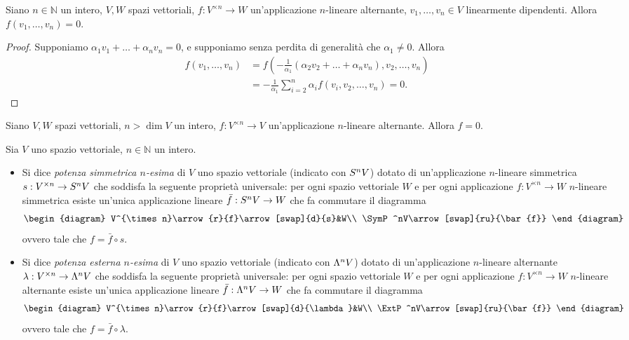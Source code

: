 \begin{proposition}
Siano $n\in\mathbb{N}$ un intero, $V\comma W$ spazi vettoriali, $f:V^{\times n}\to W$ un'applicazione $n$-lineare alternante, $v_1,\ldots,v_n\in V$ linearmente dipendenti. Allora $f(v_1,\ldots,v_n)=0$.
\end{proposition}
\begin{proof}
Supponiamo $\alpha_1v_1+\ldots+\alpha_nv_n=0$, e supponiamo senza perdita di generalità che $\alpha_1\neq 0$. Allora
\begin{align*}
f(v_1,\ldots,v_n)&=f\left(-\frac{1}{\alpha_1}(\alpha_2v_2+\ldots+\alpha_nv_n),v_2,\ldots,v_n\right)\\
&=-\frac{1}{\alpha_1}\sum_{i=2}^{n}\alpha_if(v_i,v_2,\ldots,v_n)=0.
\end{align*}
\end{proof}

\begin{corollary}
Siano $V\comma W$ spazi vettoriali, $n>\dim V$ un intero, $f:V^{\times n}\to V$ un'applicazione $n$-lineare alternante. Allora $f=0$.
\end{corollary}

\begin{definition}
Sia $V$ uno spazio vettoriale, $n\in\mathbb{N}$ un intero.
\begin{itemize}
\item Si dice \emph{potenza simmetrica $n$-esima} di $V$ uno spazio vettoriale (indicato con $S^nV$) dotato di un'applicazione $n$-lineare simmetrica $s:V^{\times n}\to S^nV$ che soddisfa la seguente proprietà universale: per ogni spazio vettoriale $W$ e per ogni applicazione $f:V^{\times n}\to W$ $n$-lineare simmetrica esiste un'unica applicazione lineare $\bar{f}:S^nV\to W$ che fa commutare il diagramma
$$
\begin{diagram}
V^{\times n}\arrow{r}{f}\arrow[swap]{d}{s}&W\\
\SymP^nV\arrow[swap]{ru}{\bar{f}}
\end{diagram}
$$
ovvero tale che $f=\bar{f}\circ s$.
\item Si dice \emph{potenza esterna $n$-esima} di $V$ uno spazio vettoriale (indicato con $\Lambda^nV$) dotato di un'applicazione $n$-lineare alternante $\lambda:V^{\times n}\to\Lambda^nV$ che soddisfa la seguente proprietà universale: per ogni spazio vettoriale $W$ e per ogni applicazione $f:V^{\times n}\to W$ $n$-lineare alternante esiste un'unica applicazione lineare $\bar{f}:\Lambda^nV\to W$ che fa commutare il diagramma
$$
\begin{diagram}
V^{\times n}\arrow{r}{f}\arrow[swap]{d}{\lambda}&W\\
\ExtP^nV\arrow[swap]{ru}{\bar{f}}
\end{diagram}
$$
ovvero tale che $f=\bar{f}\circ \lambda$.
\end{itemize}
\end{definition}

